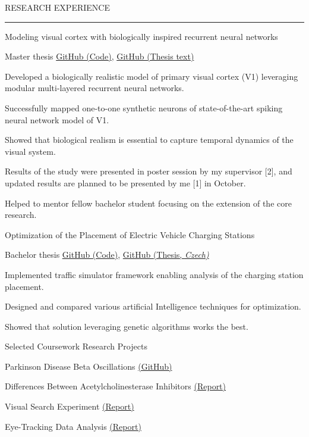 \documentclass{resume} %
\renewenvironment{rSection}[1]{
\sectionskip
\textcolor{CarnegieMellonRed}{\MakeUppercase{#1}}
\sectionlineskip
\hrule
\begin{list}{}{
\setlength{\leftmargin}{1.5em}
}
\item[]
}{
\end{list}
}
\begin{document}
\begin{rSection}{Research Experience}
\begin{rProject}{\large Modeling visual cortex with biologically inspired recurrent neural networks}{}{}{}
    \item {Master thesis \vline \:} \href{https://github.com/dbeinhauer/mcs-source}{GitHub (Code)},
    \href{https://github.com/dbeinhauer/mcs-thesis}{GitHub (Thesis text)}
    \item Developed a biologically realistic model of primary visual cortex (V1) leveraging modular multi-layered recurrent neural networks.
    \item Successfully mapped one-to-one synthetic neurons of state-of-the-art spiking neural network model of V1.
    \item Showed that biological realism is essential to capture temporal dynamics of the visual system.
    \item Results of the study were presented in poster session by my supervisor [2], and updated results are planned to be presented by me [1] in October.
    \item Helped to mentor fellow bachelor student focusing on the extension of the core research.
\end{rProject}


\begin{rProject}{\large Optimization of the Placement of Electric Vehicle Charging Stations}{}{}{}
    \item {Bachelor thesis \vline \:} 
    \href{https://github.com/dbeinhauer/bcs-source}{GitHub (Code)},
    \href{https://github.com/dbeinhauer/bcs-thesis}{GitHub (Thesis, \em Czech)}
    \item Implemented traffic simulator framework enabling analysis of the charging station placement.
    \item Designed and compared various artificial Intelligence techniques for optimization.
    \item Showed that solution leveraging genetic algorithms works the best.
\end{rProject}

\begin{rProject}{\large Selected Coursework Research Projects}{}
{}{}{}
    \item Parkinson Disease Beta Oscillations 
    {\href{https://github.com/dbeinhauer/parkinson_disease_project}{(GitHub)}}
    \item Differences Between Acetylcholinesterase Inhibitors
    {\href{https://github.com/dbeinhauer/acetylcholinester_inhibitors/blob/main/TeX/main.pdf}{(Report)}}
    \item Visual Search Experiment 
    {\href{https://raw.githack.com/dbeinhauer/visual_search_experiment/main/visual-search-experiment-report.html}{(Report)}}
    \item Eye-Tracking Data Analysis 
    {\href{https://raw.githack.com/dbeinhauer/etra_challenge/main/etra_challenge_report.html}{(Report)}}
\end{rProject}

\end{rSection}
\end{document}
